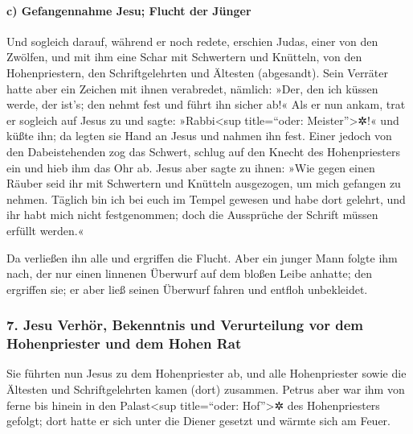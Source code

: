\hypertarget{c-gefangennahme-jesu-flucht-der-juxfcnger}{%
\paragraph{c) Gefangennahme Jesu; Flucht der
Jünger}\label{c-gefangennahme-jesu-flucht-der-juxfcnger}}

 Und sogleich darauf, während er noch redete, erschien
Judas, einer von den Zwölfen, und mit ihm eine Schar mit Schwertern und
Knütteln, von den Hohenpriestern, den Schriftgelehrten und Ältesten
(abgesandt).  Sein Verräter hatte aber ein Zeichen mit
ihnen verabredet, nämlich: »Der, den ich küssen werde, der ist's; den
nehmt fest und führt ihn sicher ab!«  Als er nun ankam,
trat er sogleich auf Jesus zu und sagte: »Rabbi\textless sup
title=``oder: Meister''\textgreater✲!« und küßte ihn;  da
legten sie Hand an Jesus und nahmen ihn fest.  Einer
jedoch von den Dabeistehenden zog das Schwert, schlug auf den Knecht des
Hohenpriesters ein und hieb ihm das Ohr ab.  Jesus aber
sagte zu ihnen: »Wie gegen einen Räuber seid ihr mit Schwertern und
Knütteln ausgezogen, um mich gefangen zu nehmen.  Täglich
bin ich bei euch im Tempel gewesen und habe dort gelehrt, und ihr habt
mich nicht festgenommen; doch die Aussprüche der Schrift müssen erfüllt
werden.«

 Da verließen ihn alle und ergriffen die Flucht.
 Aber ein junger Mann folgte ihm nach, der nur einen
linnenen Überwurf auf dem bloßen Leibe anhatte; den ergriffen sie;
 er aber ließ seinen Überwurf fahren und entfloh
unbekleidet.

\hypertarget{jesu-verhuxf6r-bekenntnis-und-verurteilung-vor-dem-hohenpriester-und-dem-hohen-rat}{%
\subsubsection{7. Jesu Verhör, Bekenntnis und Verurteilung vor dem
Hohenpriester und dem Hohen
Rat}\label{jesu-verhuxf6r-bekenntnis-und-verurteilung-vor-dem-hohenpriester-und-dem-hohen-rat}}

 Sie führten nun Jesus zu dem Hohenpriester ab, und alle
Hohenpriester sowie die Ältesten und Schriftgelehrten kamen (dort)
zusammen.  Petrus aber war ihm von ferne bis hinein in
den Palast\textless sup title=``oder: Hof''\textgreater✲ des
Hohenpriesters gefolgt; dort hatte er sich unter die Diener gesetzt und
wärmte sich am Feuer.

